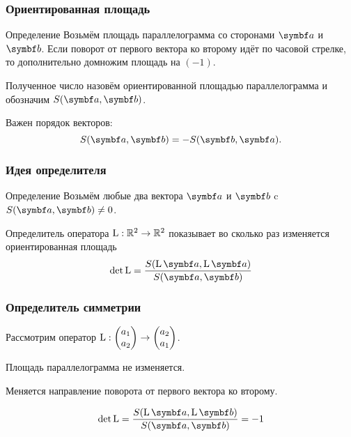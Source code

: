 \begin{frame}
    \frametitle{Ориентированная площадь}


    \begin{block}{Определение}
        Возьмём площадь параллелограмма со сторонами $\ba$ и $\bb$.
        Если поворот от первого вектора ко второму идёт по часовой стрелке, то дополнительно домножим площадь на $(-1)$.

        Полученное число назовём \alert{ориентированной площадью} параллелограмма и обозначим $S(\ba, \bb)$.    
    \end{block}

    \pause

    Важен порядок векторов: 
    \[
        S(\ba, \bb) = - S(\bb, \ba).  
    \]



    
\end{frame}



\begin{frame}
    \frametitle{Идея определителя}

\begin{block}{Определение}
    Возьмём любые два вектора $\ba$ и $\bb$ c $S(\ba, \bb)\neq 0$.

    \alert{Определитель} оператора $\operatorname{L}:\mathbb{R}^2 \to \mathbb{R}^2$ показывает во сколько раз изменяется
    ориентированная площадь
    \[
    \det \LL = \frac{S(\LL\ba, \LL\ba)}{S(\ba, \bb)}    
    \]
\end{block}    
    

\end{frame}




\begin{frame}
    \frametitle{Определитель симметрии}


    Рассмотрим оператор $\operatorname{L} : \begin{pmatrix}
      a_1 \\
      a_2 \\
    \end{pmatrix} \to 
    \begin{pmatrix}
      a_2 \\
      a_1 \\
    \end{pmatrix}$.
    

    \pause

    Площадь параллелограмма не изменяется. 


    Меняется направление поворота от первого вектора ко второму. 

    \pause

    \[
    \det \LL = \frac{S(\LL \ba, \LL \bb )}{S(\ba, \bb )} = -1
    \]

\end{frame}






